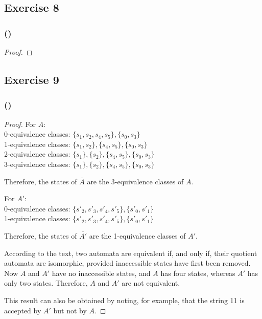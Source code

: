 \documentclass[14pt]{extarticle}
\begin{document}
\subsection{Exercise 8}

\subsubsection{()}

\begin{proof}

\end{proof}

\subsection{Exercise 9}

\subsubsection{()}

\begin{proof}
For \(A\): \\
0-equivalence classes: \(\{s_1, s_2, s_4, s_5\}, \{s_0, s_3\}\) \\
1-equivalence classes: \(\{s_1, s_2\}, \{s_4, s_5\}, \{s_0, s_3\}\) \\
2-equivalence classes: \(\{s_1\}, \{s_2\}, \{s_4, s_5\}, \{s_0, s_3\}\) \\
3-equivalence classes: \(\{s_1\}, \{s_2\}, \{s_4, s_5\}, \{s_0, s_3\}\)

Therefore, the states of \(\overline{A}\) are the 3-equivalence classes of \(A\).

For \(A'\): \\
0-equivalence classes: \(\{s'_2, s'_3, s'_4, s'_5\}, \{s'_0, s'_1\}\) \\
1-equivalence classes: \(\{s'_2, s'_3, s'_4, s'_5\}, \{s'_0, s'_1\}\)

Therefore, the states of \(\overline{A'}\) are the 1-equivalence classes of \(A'\).

According to the text, two automata are equivalent if, and only if, their quotient automata are isomorphic, provided 
inaccessible states have first been removed. Now \(A\) and \(A'\) have no inaccessible states, and \(A\) has four states, 
whereas \(A'\) has only two states. Therefore, \(A\) and \(A'\) are not equivalent.

This result can also be obtained by noting, for example, that the string 11 is accepted by \(A'\) but not by \(A\).
\end{proof}
\end{document}
